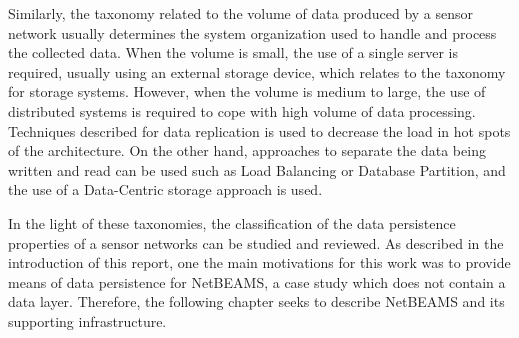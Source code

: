 Similarly, the taxonomy related to the volume of data produced by a sensor
network usually determines the system organization used to handle and process
the collected data. When the volume is small, the use of a single server is
required, usually using an external storage device, which relates to the
taxonomy for storage systems. However, when the volume is medium to large, the
use of distributed systems is required to cope with high volume of data
processing. Techniques described for data replication is used to decrease the
load in hot spots of the architecture. On the other hand, approaches to
separate the data being written and read can be used such as Load Balancing or
Database Partition, and the use of a Data-Centric storage approach is used.

In the light of these taxonomies, the classification of the data persistence
properties of a sensor networks can be studied and reviewed. As described in
the introduction of this report, one the main motivations for this work
was to provide means of data persistence for NetBEAMS, a case study which does
not contain a data layer. Therefore, the following chapter seeks to describe
NetBEAMS and its supporting infrastructure.
